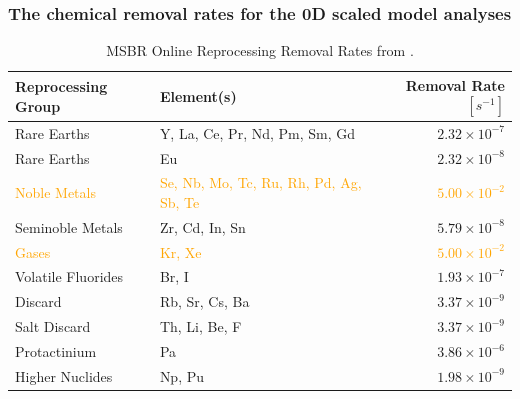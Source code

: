 \begin{frame}
    \frametitle{The chemical removal rates for the 0D scaled model analyses}
\begin{table}[H]
\renewcommand{\arraystretch}{1.25}
\caption{MSBR Online Reprocessing Removal Rates from \cite{robertson_conceptual_1971}.}
\begin{center}
\begin{tabular}{ l p{} r}
 \hline
 Reprocessing Group & Element(s) & Removal Rate $[s^{-1}]$\\
 \hline
 Rare Earths & Y, La, Ce, Pr, Nd, Pm, Sm, Gd & $2.32 \times 10^{-7}$\\
 Rare Earths & Eu & $2.32 \times 10^{-8}$\\
 \textcolor{orange}{Noble Metals}  & \textcolor{orange}{Se, Nb, Mo, Tc, Ru, Rh, Pd, Ag, Sb, Te} & \textcolor{orange}{$5.00 \times 10^{-2}$}\\
 Seminoble Metals & Zr, Cd, In, Sn &  $5.79 \times 10^{-8}$\\
 \textcolor{orange}{Gases} & \textcolor{orange}{Kr, Xe} & \textcolor{orange}{$5.00 \times 10^{-2}$}\\
 Volatile Fluorides & Br, I & $1.93 \times 10^{-7}$\\
 Discard & Rb, Sr, Cs, Ba & $3.37 \times 10^{-9}$\\
 Salt Discard & Th, Li, Be, F & $3.37 \times 10^{-9}$\\
 Protactinium & Pa & $3.86 \times 10^{-6}$\\
 Higher Nuclides & Np, Pu & $1.98 \times 10^{-9}$\\
 \hline
\end{tabular}
\end{center}
\end{table}
\end{frame}
